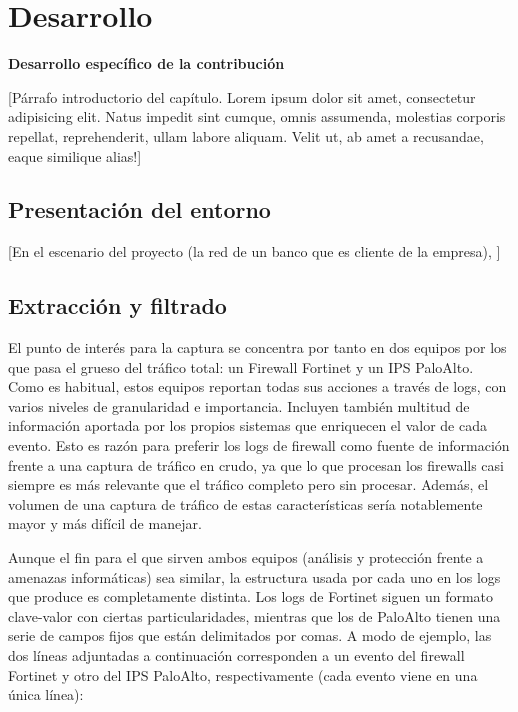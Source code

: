 \chapter{Desarrollo}\label{chap:desarrollo}
\textbf{Desarrollo específico de la contribución}

[Párrafo introductorio del capítulo. Lorem ipsum dolor sit amet, consectetur adipisicing elit. Natus impedit sint cumque, omnis assumenda, molestias corporis repellat, reprehenderit, ullam labore aliquam. Velit ut, ab amet a recusandae, eaque similique alias!]

\section{Presentación del entorno}\label{sec:presentaciondelentorno}

[En el escenario del proyecto (la red de un banco que es cliente de la empresa), ]

\section{Extracción y filtrado}\label{sec:extraccionyfiltrado}

El punto de interés para la captura se concentra por tanto en dos equipos por los que pasa el grueso del tráfico total: un Firewall Fortinet y un IPS PaloAlto.
Como es habitual, estos equipos reportan todas sus acciones a través de logs, con varios niveles de granularidad e importancia.
Incluyen también multitud de información aportada por los propios sistemas que enriquecen el valor de cada evento.
Esto es razón para preferir los logs de firewall como fuente de información frente a una captura de tráfico en crudo, ya que
lo que procesan los firewalls casi siempre es más relevante que el tráfico completo pero sin procesar.
Además, el volumen de una captura de tráfico de estas características sería notablemente mayor y más difícil de manejar.

Aunque el fin para el que sirven ambos equipos (análisis y protección frente a amenazas informáticas) sea similar,
la estructura usada por cada uno en los logs que produce es completamente distinta.
Los logs de Fortinet siguen un formato clave-valor con ciertas particularidades, mientras que los de PaloAlto tienen una serie de campos fijos que están delimitados por comas.
A modo de ejemplo, las dos líneas adjuntadas a continuación corresponden a un evento del firewall Fortinet y otro del IPS PaloAlto, respectivamente (cada evento viene en una única línea):

